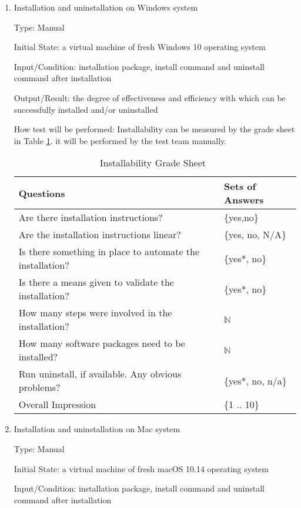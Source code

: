 \documentclass[12pt, titlepage]{article}
\begin{document}
\begin{enumerate}

\item{Installation and uninstallation on Windows system}

Type: Manual
					
Initial State: a virtual machine of fresh Windows 10 operating system
					
Input/Condition: \progname{} installation package, install command and uninstall
command after installation
					
Output/Result: the degree of effectiveness and efficiency with which \progname{}
can be successfully installed and/or uninstalled
					
How test will be performed: Installability can be measured by the grade sheet in
Table \ref{Tb_install}. it will be performed by the test team manually.

\begin{table}[h]
\begin{tabular}{@{}ll@{}}
\toprule
Questions & Sets of Answers \\ \midrule
Are there installation instructions? & \{yes,no\} \\
Are the installation instructions linear? & \{yes, no, N/A\} \\
Is there something in place to automate the installation? & \{yes*, no\} \\
Is there a means given to validate the installation? & \{yes*, no\} \\
How many steps were involved in the installation? & $\mathbb{N}$ \\
How many software packages need to be installed? & $\mathbb{N}$ \\
Run uninstall, if available. Any obvious problems? & \{yes*, no, n/a\} \\
Overall Impression & \{1 .. 10\}\\ \bottomrule
\end{tabular}
\caption{Installability Grade Sheet~\cite{SmithEtAl2018}}
\label{Tb_install}
\end{table}

\item{Installation and uninstallation on Mac system}

Type: Manual
					
Initial State: a virtual machine of fresh macOS 10.14 operating system
					
Input/Condition: \progname{} installation package, install command and uninstall
command after installation
					

\end{enumerate}
\end{document}
